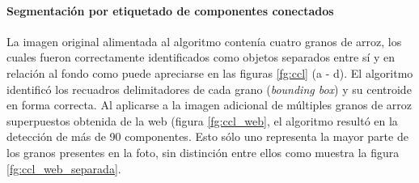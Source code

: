 \documentclass{article}
\begin{document}
\paragraph{Segmentación por etiquetado de componentes conectados}

La imagen original alimentada al algoritmo contenía cuatro granos de arroz, los cuales fueron correctamente identificados como objetos separados entre sí y en relación al fondo como puede apreciarse en las figuras \ref{fg:ccl} (a - d).
El algoritmo identificó los recuadros delimitadores de cada grano (\textit{bounding box}) y su centroide en forma correcta.
Al aplicarse a la imagen adicional de múltiples granos de arroz superpuestos obtenida de la web (figura \ref{fg:ccl_web}, el algoritmo resultó en la detección de más de 90 componentes.
Esto sólo uno representa la mayor parte de los granos presentes en la foto, sin distinción entre ellos como muestra la figura \ref{fg:ccl_web_separada}.
\end{document}
